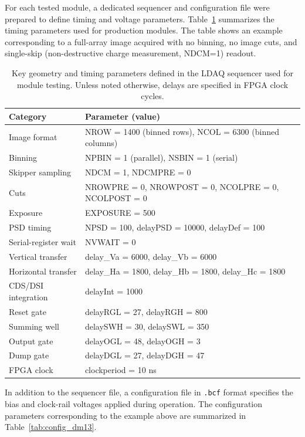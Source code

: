 \documentclass[11pt]{article}
\begin{document}
For each tested module, a dedicated sequencer and configuration file were prepared to define timing and voltage parameters. Table~\ref{tab:sequencer_timing_dm13} summarizes the timing parameters used for production modules. The table shows an example corresponding to a full-array image acquired with no binning, no image cuts, and single-skip (non-destructive charge measurement, NDCM=1) readout.
%
\begin{table}[H]
\centering
\caption{Key geometry and timing parameters defined in the LDAQ sequencer used for module testing. Unless noted otherwise, delays are specified in FPGA clock cycles.}
\label{tab:sequencer_timing_dm13}
\begin{tabular}{@{}ll@{}}
\toprule
\textbf{Category} & \textbf{Parameter (value)} \\
\midrule
Image format & NROW = 1400 (binned rows), NCOL = 6300 (binned columns) \\
Binning & NPBIN = 1 (parallel), NSBIN = 1 (serial) \\
Skipper sampling & NDCM = 1, NDCMPRE = 0 \\
Cuts & NROWPRE = 0, NROWPOST = 0, NCOLPRE = 0, NCOLPOST = 0 \\
Exposure & EXPOSURE = 500 \\
PSD timing & NPSD = 100, delayPSD = 10000, delayDef = 100 \\
Serial-register wait & NVWAIT = 0 \\
Vertical transfer & delay\_Va = 6000, delay\_Vb = 6000 \\
Horizontal transfer & delay\_Ha = 1800, delay\_Hb = 1800, delay\_Hc = 1800 \\
CDS/DSI integration & delayInt = 1000 \\
Reset gate & delayRGL = 27, delayRGH = 800 \\
Summing well & delaySWH = 30, delaySWL = 350 \\
Output gate & delayOGL = 48, delayOGH = 3 \\
Dump gate & delayDGL = 27, delayDGH = 47 \\
FPGA clock & clockperiod = 10 ns \\
\bottomrule
\end{tabular}
\end{table}
%
In addition to the sequencer file, a configuration file in \texttt{.bcf} format specifies the bias and clock-rail voltages applied during operation. The configuration parameters corresponding to the example above are summarized in Table~\ref{tab:config_dm13}.
\end{document}
